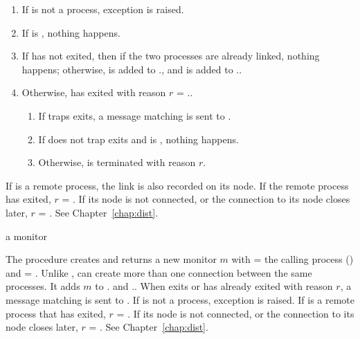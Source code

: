 \begin{enumerate}
\item If  is not a process, exception  is raised.
\item If  is , nothing happens.
\item If  has not exited, then if the two processes are
  already linked, nothing happens; otherwise,  is added to
  ., and  is added to
  ..
\item Otherwise,  has exited with reason $r$ =
  ..
  \begin{enumerate}
  \item If  traps exits, a message matching 
    is sent to .
  \item If  does not trap exits and  is ,
    nothing happens.
  \item Otherwise,  is terminated with reason $r$.
  \end{enumerate}
\end{enumerate}

If  is a remote process, the link is also recorded on its
node. If the remote process has exited, $r$ = . If its
node is not connected, or the connection to its node closes later,
$r$ = . See Chapter~\ref{chap:dist}.

\begin{procedure}
\end{procedure}
\returns{} a monitor

The  procedure creates and returns a new monitor $m$
with  = the calling process () and
 = .  Unlike ,
 can create more than one connection between the same
processes.  It adds $m$ to . and
..  When  exits or has
already exited with reason $r$, a message matching
 is sent to .
If  is not
a process, exception  is
raised. If  is a remote process that has exited, $r$ =
. If its node is not connected, or the connection to its
node closes later, $r$ = . See
Chapter~\ref{chap:dist}.

